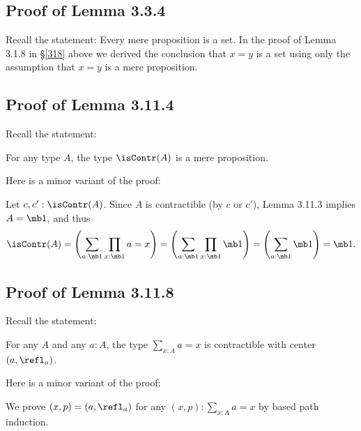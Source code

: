 \documentclass[12pt]{article}
\begin{document}

\subsection{Proof of Lemma 3.3.4}

Recall the statement: Every mere proposition is a set. In the proof of Lemma 3.1.8 in \S\ref{318} above we derived the conclusion that $x=y$ is a set using only the assumption that $x=y$ is a mere proposition.


\subsection{Proof of Lemma 3.11.4} 

Recall the statement: 

For any type $A$, the type $\isContr(A)$ is a mere proposition.

Here is a minor variant of the proof:

Let $c,c':\isContr(A)$. Since $A$ is contractible (by $c$ or $c'$), Lemma 3.11.3 implies $A=\mb1$, and thus 
$$
\isContr(A)=\left(\sum_{a:\mb1}\prod_{x:\mb1}a=x\right)=\left(\sum_{a:\mb1}\prod_{x:\mb1}\mb1\right)=\left(\sum_{a:\mb1}\mb1\right)=\mb1.
$$


\subsection{Proof of Lemma 3.11.8} 

Recall the statement: 

For any $A$ and any $a:A$, the type $\sum_{x:A}a=x$ is contractible with center $(a,\refl_a)$. 

Here is a minor variant of the proof:

We prove $(x,p)=(a,\refl_a)$ for any $(x,p):\sum_{x:A}a=x$ by based path induction.


\begin{comment}

\subsection{Lemma 3.11.9}

Lemma 3.11.9 (i) yields the following strengthening of Lemma 3.5.1:

In the setting of Lemma 3.5.1, the map 
$$
\ap_{\pr_1}:(u=v)\to(\pr_1(u)=\pr_1(v))
$$ 
is an equivalence.

\end{comment}
\end{document}
